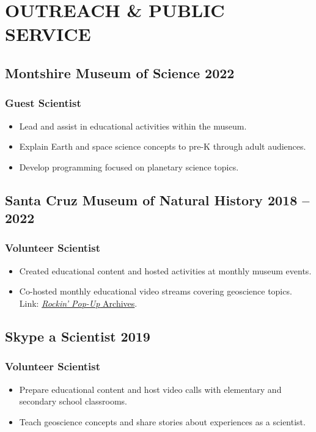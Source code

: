 \section*{OUTREACH \& PUBLIC SERVICE}

\subsection*{\textbf{Montshire Museum of Science} \hfill 2022\ongoing}
\subsubsection*{Guest Scientist}
\begin{itemize}
\item Lead and assist in educational activities within the museum.
\item Explain Earth and space science concepts to pre-K through adult audiences.
\item Develop programming focused on planetary science topics.
\end{itemize}

\subsection*{\textbf{Santa Cruz Museum of Natural History} \hfill 2018 – 2022}
\subsubsection*{Volunteer Scientist}
\begin{itemize}
	\item Created educational content and hosted activities at monthly museum events.
	\item Co-hosted monthly educational video streams covering geoscience topics. \\
	Link: \href{https://www.santacruzmuseum.org/category/rockin-pop-up/}{\emph{Rockin' Pop-Up} Archives}.
\end{itemize}

\subsection*{\textbf{Skype a Scientist} \hfill 2019\ongoing}
\subsubsection*{Volunteer Scientist}
\begin{itemize}
	\item Prepare educational content and host video calls with elementary and secondary school classrooms.
	\item Teach geoscience concepts and share stories about experiences as a scientist.
\end{itemize}

